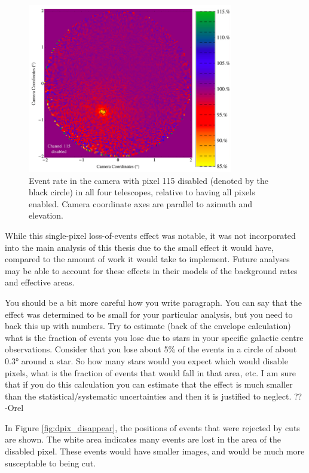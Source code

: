     \begin{figure}[ht]
      \centering
      \includegraphics[width=0.8\textwidth]{images/disabled_pixel/relativerate_camera}
      \caption[Relative Event Rate]{
        Event rate in the camera with pixel 115 disabled (denoted by the black circle) in all four telescopes, relative to having all pixels enabled.
        Camera coordinate axes are parallel to azimuth and elevation.
      }
      \label{fig:dpix_rel_camera}
    \end{figure}
    
    While this single-pixel loss-of-events effect was notable, it was not incorporated into the main analysis of this thesis due to the small effect it would have, compared to the amount of work it would take to implement.
    Future analyses may be able to account for these effects in their models of the background rates and effective areas.
    
    {\color{red}You should be a bit more careful how you write paragraph. You can say that the effect was determined to be small for your particular analysis, but you need to back this up with numbers. 
Try to estimate (back of the envelope calculation) what is the fraction of events you lose due to stars in your specific galactic centre observations. Consider that you lose about 5\% of the events in a circle of about \ang{0.3} around a star. So how many stars would you expect which would disable pixels, what is the fraction of events that would fall in that area, etc. 
I am sure that if you do this calculation you can estimate that the effect is much smaller than the statistical/systematic uncertainties and then it is justified to neglect. ?? -Orel}

    In Figure \ref{fig:dpix_disappear}, the positions of events that were rejected by cuts are shown.
    The white area indicates many events are lost in the area of the disabled pixel.
    These events would have smaller images, and would be much more susceptable to being cut.

